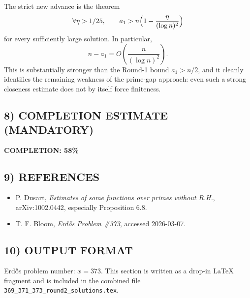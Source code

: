 The strict new advance is the theorem
\[
\forall \eta>1/25,\qquad
 a_{1}>n\Bigl(1-\frac{\eta}{(\log n)^{2}}\Bigr)
\]
for every sufficiently large solution. In particular,
\[
n-a_{1}=O\!\left(\frac{n}{(\log n)^{2}}\right).
\]
This is substantially stronger than the Round-1 bound $a_{1}>n/2$, and it cleanly identifies the remaining weakness of the prime-gap approach: even such a strong closeness estimate does not by itself force finiteness.

\subsection*{8) COMPLETION ESTIMATE (MANDATORY)}
\textbf{COMPLETION: 58\%}

\subsection*{9) REFERENCES}
\begin{itemize}
\item P. Dusart, \emph{Estimates of some functions over primes without R.H.}, arXiv:1002.0442, especially Proposition 6.8.
\item T. F. Bloom, \emph{Erd\H{o}s Problem \#373}, accessed 2026-03-07.
\end{itemize}

\subsection*{10) OUTPUT FORMAT}
Erd\H{o}s problem number: $x=373$. This section is written as a drop-in \LaTeX{} fragment and is included in the combined file \texttt{369\_371\_373\_round2\_solutions.tex}.
